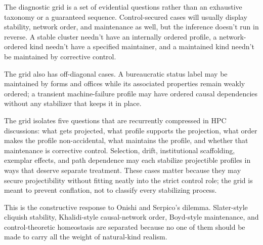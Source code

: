 \documentclass[12pt]{article}
\begin{document}
The diagnostic grid is a set of evidential questions rather than an exhaustive
taxonomy or a guaranteed sequence. Control-secured cases will usually display
stability, network order, and maintenance as well, but the inference doesn't run
in reverse. A stable cluster needn't have an internally ordered profile, a
network-ordered kind needn't have a specified maintainer, and a maintained kind
needn't be maintained by corrective control.

The grid also has off-diagonal cases. A bureaucratic status label may be
maintained by forms and offices while its associated properties remain weakly
ordered; a transient machine-failure profile may have ordered causal dependencies
without any stabilizer that keeps it in place.

The grid isolates five questions that are recurrently compressed in HPC
discussions: what gets projected, what profile supports the projection, what order
makes the profile non-accidental, what maintains the profile, and whether that
maintenance is corrective control. Selection, drift, institutional scaffolding,
exemplar effects, and path dependence may each stabilize projectible profiles in
ways that deserve separate treatment. These cases matter because they may secure
projectibility without fitting neatly into the strict control role; the grid is
meant to prevent conflation, not to classify every stabilizing process.

This is the constructive response to Onishi and Serpico's dilemma. Slater-style
cliquish stability, Khalidi-style causal-network order, Boyd-style maintenance,
and control-theoretic homeostasis are separated because no one of them should be
made to carry all the weight of natural-kind realism.
\end{document}
